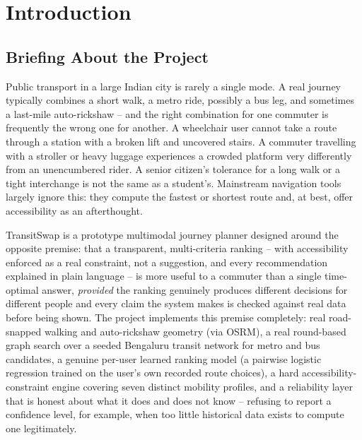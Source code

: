 \documentclass[12pt,a4paper]{report}
\begin{document}
\clearpage

\tableofcontents
\clearpage
\listoffigures
\clearpage
\listoftables
\clearpage

\setcounter{page}{1}

\chapter{Introduction}

\section{Briefing About the Project}

Public transport in a large Indian city is rarely a single mode. A real journey typically combines
a short walk, a metro ride, possibly a bus leg, and sometimes a last-mile auto-rickshaw -- and the
right combination for one commuter is frequently the wrong one for another. A wheelchair user
cannot take a route through a station with a broken lift and uncovered stairs. A commuter travelling
with a stroller or heavy luggage experiences a crowded platform very differently from an
unencumbered rider. A senior citizen's tolerance for a long walk or a tight interchange is not the
same as a student's. Mainstream navigation tools largely ignore this: they compute the fastest or
shortest route and, at best, offer accessibility as an afterthought.

TransitSwap is a prototype multimodal journey planner designed around the opposite premise: that a
transparent, multi-criteria ranking -- with accessibility enforced as a real constraint, not a
suggestion, and every recommendation explained in plain language -- is more useful to a commuter
than a single time-optimal answer, \emph{provided} the ranking genuinely produces different
decisions for different people and every claim the system makes is checked against real data
before being shown. The project implements this premise completely: real road-snapped walking and
auto-rickshaw geometry (via OSRM), a real round-based graph search over a seeded Bengaluru transit
network for metro and bus candidates, a genuine per-user learned ranking model (a pairwise logistic
regression trained on the user's own recorded route choices), a hard accessibility-constraint
engine covering seven distinct mobility profiles, and a reliability layer that is honest about what
it does and does not know -- refusing to report a confidence level, for example, when too little
historical data exists to compute one legitimately.
\end{document}
